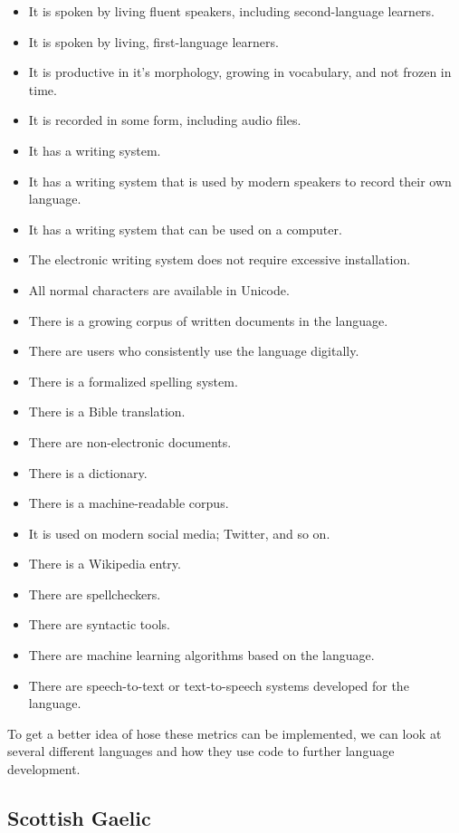 \documentclass[10pt, a4paper]{article}
\begin{document}
\begin{itemize}
\item It is spoken by living fluent speakers, including second-language learners.
\item It is spoken by living, first-language learners.
\item It is productive in it's morphology, growing in vocabulary, and not frozen in time.
\item It is recorded in some form, including audio files.
\item It has a writing system.
\item It has a writing system that is used by modern speakers to record their own language.
\item It has a writing system that can be used on a computer.
\item The electronic writing system does not require excessive installation.
\item All normal characters are available in Unicode.
\item There is a growing corpus of written documents in the language.
\item There are users who consistently use the language digitally.
\item There is a formalized spelling system.
\item There is a Bible translation. %
\item There are non-electronic documents.
\item There is a dictionary.
\item There is a machine-readable corpus.
\item It is used on modern social media; Twitter, and so on.
\item There is a Wikipedia entry.
\item There are spellcheckers.
\item There are syntactic tools.
\item There are machine learning algorithms based on the language.
\item There are speech-to-text or text-to-speech systems developed for the language.
\end{itemize}

To get a better idea of hose these metrics can be implemented, we can look at several different languages and how they use code to further language development.

\subsection{Scottish Gaelic}
\end{document}
